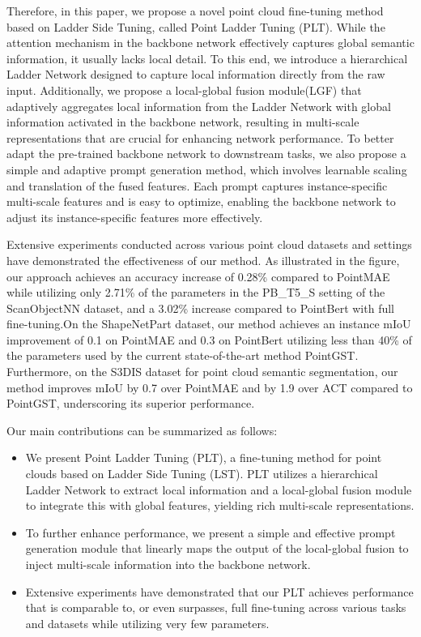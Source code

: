 Therefore, in this paper, we propose a novel point cloud fine-tuning method based on Ladder Side Tuning, called Point Ladder Tuning (PLT). While the attention mechanism in the backbone network effectively captures global semantic information, it usually lacks local detail. To this end, we introduce a hierarchical Ladder Network designed to capture local information directly from the raw input. Additionally, we propose a local-global fusion module(LGF) that adaptively aggregates local information from the Ladder Network with global information activated in the backbone network, resulting in multi-scale representations that are crucial for enhancing network performance. To better adapt the pre-trained backbone network to downstream tasks, we also propose a simple and adaptive prompt generation method, which involves learnable scaling and translation of the fused features. Each prompt captures instance-specific multi-scale features and is easy to optimize, enabling the backbone network to adjust its instance-specific features more effectively.

Extensive experiments conducted across various point cloud datasets and settings have demonstrated the effectiveness of our method. As illustrated in the figure, our approach achieves an accuracy increase of 0.28\% compared to PointMAE\cite{pang2022masked} while utilizing only 2.71\% of the parameters in the PB\_T5\_S setting of the ScanObjectNN  dataset\cite{uy2019revisiting}, and a 3.02\% increase compared to PointBert with full fine-tuning.On the ShapeNetPart dataset\cite{wu20153d}, our method achieves an instance mIoU improvement of 0.1 on PointMAE\cite{pang2022masked} and 0.3 on PointBert\cite{yu2022point} utilizing less than 40\% of the parameters used by the current state-of-the-art method PointGST. Furthermore, on the S3DIS dataset\cite{armeni20163d} for point cloud semantic segmentation, our method improves mIoU by 0.7 over PointMAE and by 1.9 over ACT\cite{dong2022autoencoders} compared to PointGST\cite{liang2024parameter}, underscoring its superior performance.

Our main contributions can be summarized as follows:

\begin{itemize}
\item We present Point Ladder Tuning (PLT), a fine-tuning method for point clouds based on Ladder Side Tuning (LST). PLT utilizes a hierarchical Ladder Network to extract local information and a local-global fusion module to integrate this with global features, yielding rich multi-scale representations.
\item To further enhance performance, we present a simple and effective prompt generation module that linearly maps the output of the local-global fusion to inject multi-scale information into the backbone network.
\item Extensive experiments have demonstrated that our PLT achieves performance that is comparable to, or even surpasses, full fine-tuning across various tasks and datasets while utilizing very few parameters.
\end{itemize}


